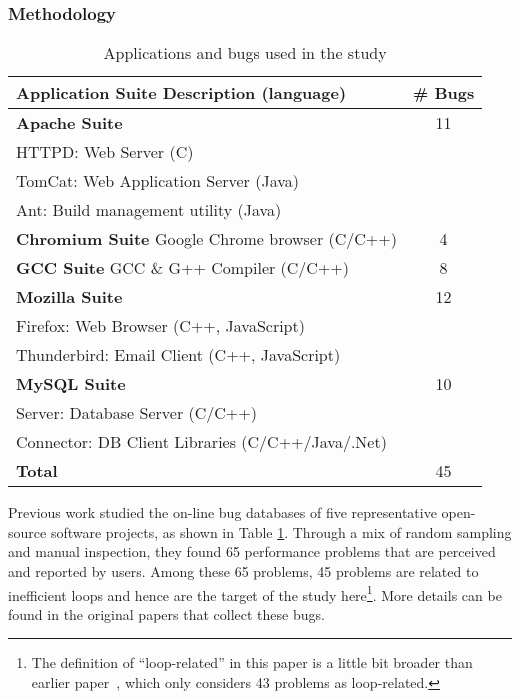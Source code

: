 \subsubsection{Methodology}
\begin{table}[h!]
\centering
\begin{tabular}{@{\hspace{3pt}}l@{\hspace{3pt}}|@{\hspace{3pt}}c@{\hspace{3pt}}}
\hline
Application Suite Description (language) & \# Bugs \\
\hline                            
{\bf Apache Suite} 	 & 11\\
{HTTPD:	Web Server (C)	}& \\
{TomCat:  Web Application Server (Java)}& \\
{Ant:	Build management utility (Java)}& \\
\hline                            
{\bf Chromium Suite} Google Chrome browser (C/C++) & 4\\
\hline
{\bf GCC Suite}  GCC \& G++ Compiler (C/C++)     & 8\\
\hline
{\bf Mozilla Suite}  & 12\\
{Firefox: Web Browser (C++, JavaScript)}& 	\\
{Thunderbird: Email Client (C++, JavaScript)}& \\
\hline
{\bf MySQL Suite}     & 10	\\
{Server: Database Server (C/C++)}&  	\\
{Connector: DB Client Libraries (C/C++/Java/.Net)} &  	\\
\hline
{\bf Total}	   & 45 \\
\hline
\end{tabular}
\caption{Applications and bugs used in the study}
\label{tab:app_bug}
\end{table}

Previous work \cite{PerfBug,SongOOPSLA2014} studied the on-line bug
databases of five representative open-source software projects, as 
shown in Table \ref{tab:app_bug}. Through a mix of random sampling and 
manual inspection, they 
found 65 performance problems that are perceived and reported by users. 
Among these 65 problems, 45 problems are related to inefficient loops and 
hence are the target of the study 
here\footnote{The definition of ``loop-related'' in this paper is a little
bit broader than earlier paper~\cite{SongOOPSLA2014}, which only considers
43 problems as loop-related. }.
More details can be found in the original papers that collect
these bugs. 

